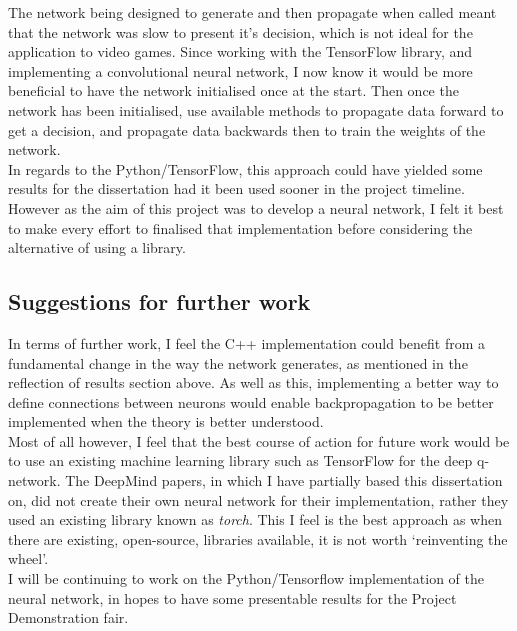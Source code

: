 \documentclass[10pt]{article}
\begin{document}
		The network being designed to generate and then propagate when called meant that the network was slow to present it's decision, which is not ideal for the application to video games. Since working with the TensorFlow library, and implementing a convolutional neural network, I now know it would be more beneficial to have the network initialised once at the start. Then once the network has been initialised, use available methods to propagate data forward to get a decision, and propagate data backwards then to train the weights of the network.\\
		
		In regards to the Python/TensorFlow, this approach could have yielded some results for the dissertation had it been used sooner in the project timeline. However as the aim of this project was to develop a neural network, I felt it best to make every effort to finalised that implementation before considering the alternative of using a library.
	
	\medskip

	\subsection{Suggestions for further work}
		In terms of further work, I feel the C++ implementation could benefit from a fundamental change in the way the network generates, as mentioned in the reflection of results section above. As well as this, implementing a better way to define connections between neurons would enable backpropagation to be better implemented when the theory is better understood.\\
		
		Most of all however, I feel that the best course of action for future work would be to use an existing machine learning library such as TensorFlow for the deep q-network. The DeepMind papers, in which I have partially based this dissertation on, did not create their own neural network for their implementation, rather they used an existing library known as \textit{torch}. This I feel is the best approach as when there are existing, open-source, libraries available, it is not worth `reinventing the wheel'.\\
		
		I will be continuing to work on the Python/Tensorflow implementation of the neural network, in hopes to have some presentable results for the Project Demonstration fair.


\newpage
\printbibliography[
	    heading=bibintoc,
        title={References}
    ]
\newpage
\appendix
\end{document}
